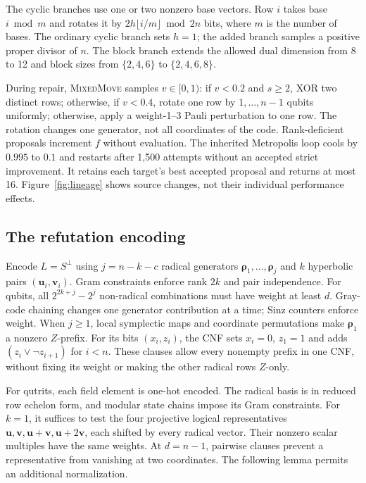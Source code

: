 \documentclass{article}
\newcommand{\vct}[1]{\boldsymbol{#1}} %
\begin{document}
The cyclic branches use one or two nonzero base vectors. Row $i$ takes
base $i\bmod m$ and rotates it by
$2h\lfloor i/m\rfloor\bmod 2n$ bits, where $m$ is the number of bases.
The ordinary cyclic branch sets $h=1$; the added branch samples a positive
proper divisor of $n$. The block branch extends the allowed dual dimension
from 8 to 12 and block sizes from $\{2,4,6\}$ to $\{2,4,6,8\}$.

During repair, \textsc{MixedMove} samples $v\in[0,1)$: if $v<0.2$
and $s\ge2$, XOR two distinct rows; otherwise, if $v<0.4$, rotate one
row by $1,\ldots,n-1$ qubits uniformly; otherwise, apply a weight-1--3
Pauli perturbation to one row. The rotation changes one generator,
not all coordinates of the code. Rank-deficient proposals increment $f$
without evaluation. The inherited Metropolis loop cools by $0.995$ to
$0.1$ and restarts after 1,500 attempts without an accepted strict
improvement. It retains each target's best accepted proposal and returns
at most 16. Figure~\ref{fig:lineage} shows source changes, not their
individual performance effects.

\subsection{The refutation encoding}\label{app:sat}
Encode $L=S^\perp$ using $j=n-k-c$ radical generators
$\vct\rho_1,\ldots,\vct\rho_j$ and $k$ hyperbolic pairs
$(\vct u_i,\vct v_i)$. Gram constraints enforce rank $2k$ and pair
independence. For qubits, all $2^{2k+j}-2^j$ non-radical combinations
must have weight at least $d$. Gray-code chaining changes one generator
contribution at a time; Sinz counters enforce weight. When $j\ge1$,
local symplectic maps and coordinate permutations make $\vct\rho_1$
a nonzero $Z$-prefix. For its bits $(x_i,z_i)$, the CNF sets
$x_i=0$, $z_1=1$ and adds $(z_i\lor\neg z_{i+1})$ for $i<n$.
These clauses allow every nonempty prefix in one CNF, without fixing its
weight or making the other radical rows $Z$-only.

For qutrits, each field element is one-hot encoded. The radical basis is
in reduced row echelon form, and modular state chains impose its
Gram constraints. For $k=1$, it suffices to test the four projective
logical representatives $\vct{u},\vct{v},\vct{u}+\vct{v},\vct{u}+2\vct{v}$, each shifted by every radical
vector. Their nonzero scalar multiples have the same weights. At
$d=n-1$, pairwise clauses prevent a representative from vanishing at two
coordinates. The following lemma permits an additional normalization.
\end{document}
